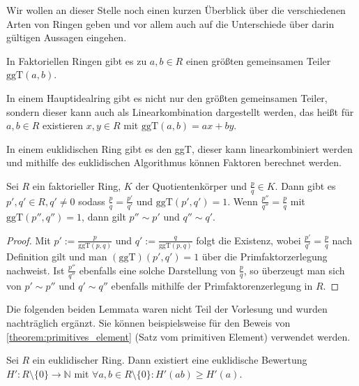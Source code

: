 \begin{remark}
    Wir wollen an dieser Stelle noch einen kurzen Überblick über die verschiedenen Arten von Ringen
    geben und vor allem auch auf die Unterschiede über darin gültigen Aussagen eingehen.

    In Faktoriellen Ringen gibt es zu $a,b\in R$ einen größten gemeinsamen Teiler $\mathrm{ggT}(a,b)$.

    In einem Hauptidealring gibt es nicht nur den größten gemeinsamen Teiler, sondern dieser kann auch als Linearkombination
    dargestellt werden, das heißt für $a,b\in R$ existieren $x,y\in R$ mit $\mathrm{ggT}(a,b)=ax+by$.

    In einem euklidischen Ring gibt es den ggT, dieser kann linearkombiniert werden und mithilfe des euklidischen Algorithmus
    können Faktoren berechnet werden.
\end{remark}

\begin{proposition}
    Sei $R$ ein faktorieller Ring, $K$ der Quotientenkörper und $\frac{p}{q}\in K$. Dann gibt es
    $p',q'\in R, q'\neq 0$ sodass $\frac{p}{q}=\frac{p'}{q'}$ und $\mathrm{ggT}(p',q')=1$. Wenn
    $\frac{p''}{q''}=\frac{p}{q}$ mit $\mathrm{ggT}(p'',q'')=1$, dann gilt $p''\sim p'$ und $q''\sim q'$.
\end{proposition}

\begin{proof}
    Mit $p':=\frac{p}{\mathrm{ggT}(p,q)}$ und $q':=\frac{q}{\mathrm{ggT}(p,q)}$ folgt die Existenz,
    wobei $\frac{p'}{q'}=\frac{p}{q}$ nach Definition gilt und man $\mathrm{(ggT)}(p',q')=1$ über die Primfaktorzerlegung nachweist.
    Ist $\frac{p''}{q''}$ ebenfalls eine solche Darstellung von $\frac{p}{q}$, so überzeugt man sich
    von $p'\sim p''$ und $q'\sim q''$ ebenfalls mithilfe der Primfaktorenzerlegung in $R$.
\end{proof}

\begin{remark}
    Die folgenden beiden Lemmata waren nicht Teil der Vorlesung und wurden nachträglich ergänzt. Sie können beispielsweise für den Beweis von \cref*{theorem:primitives_element} (Satz vom primitiven Element) verwendet werden.
\end{remark}

\begin{lemma}
    Sei $R$ ein euklidischer Ring. Dann existiert eine euklidische Bewertung $H':R\setminus\{0\}\to \mathbb{N}$ mit $\forall a,b\in R\setminus\{0\}:H'(ab)\geq H'(a)$.
\end{lemma}

